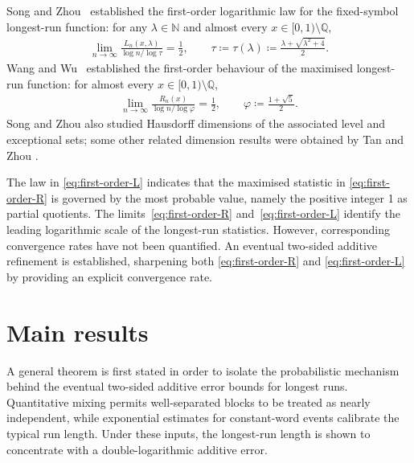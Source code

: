 \documentclass[12pt,reqno]{amsart}
\theoremstyle{definition}
\theoremstyle{plain}
\begin{document}
Song and Zhou~\cite[Theorem~1.1]{SongZhou2020LongestBlock} established the first-order logarithmic law for the fixed-symbol longest-run function: for any $\lambda\in\mathbb{N}$ and almost every $x\in[0,1)\setminus\mathbb{Q}$,
\begin{align}\label{eq:first-order-L}
    \lim_{n\to\infty}\frac{L_n(x,\lambda)}{\log{n}/\log{\tau}}=\frac12,
    \qquad
    \tau\coloneqq\tau(\lambda)\coloneqq \frac{\lambda+\sqrt{\lambda^2+4}}{2}.
\end{align}
Wang and Wu~\cite{WangWu2011MaxRunLength} established the first-order behaviour of the maximised longest-run function: for almost every $x\in[0,1)\setminus\mathbb{Q}$,
\begin{align}\label{eq:first-order-R}
    \lim_{n\to\infty}\frac{R_n(x)}{\log{n}/\log{\varphi}}=\frac12,
    \qquad
    \varphi\coloneqq\frac{1+\sqrt5}{2}.
\end{align}
Song and Zhou also studied Hausdorff dimensions of the associated level and exceptional sets; some other related dimension results were obtained by Tan and Zhou \cite{TanZhou2025UniformDiophantineRunLength}.

The law in \eqref{eq:first-order-L} indicates that the maximised statistic in \eqref{eq:first-order-R} is governed by the most probable value, namely the positive integer 1 as partial quotients. The limits~\eqref{eq:first-order-R} and~\eqref{eq:first-order-L} identify the leading logarithmic scale of the longest-run statistics. However, corresponding convergence rates have not been quantified. An eventual two-sided additive refinement is established, sharpening both \eqref{eq:first-order-R} and \eqref{eq:first-order-L} by providing an explicit convergence rate.

\section{Main results}

A general theorem is first stated in order to isolate the probabilistic mechanism behind the eventual two-sided additive error bounds for longest runs. Quantitative mixing permits well-separated blocks to be treated as nearly independent, while exponential estimates for constant-word events calibrate the typical run length. Under these inputs, the longest-run length is shown to concentrate with a double-logarithmic additive error.
\end{document}
